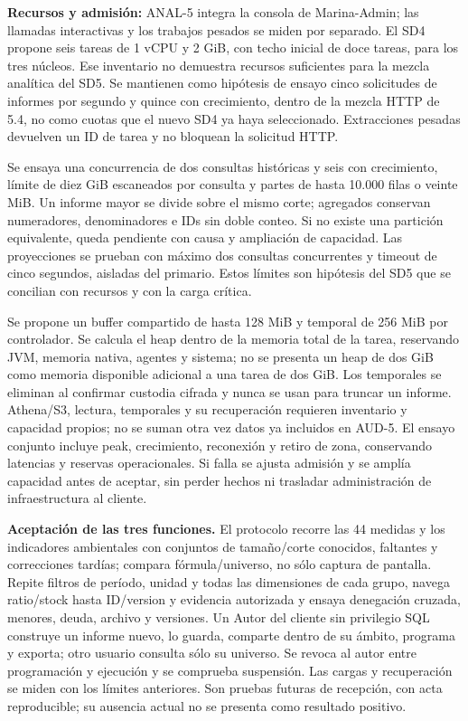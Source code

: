 \textbf{Recursos y admisión:} 
ANAL-5 integra la consola de Marina-Admin; las llamadas interactivas y los trabajos pesados se miden por separado. El SD4 propone seis tareas de 1 vCPU y 2 GiB, con techo inicial de doce tareas, para los tres núcleos. Ese inventario no demuestra recursos suficientes para la mezcla analítica del SD5. Se mantienen como hipótesis de ensayo cinco solicitudes de informes por segundo y quince con crecimiento, dentro de la mezcla HTTP de 5.4, no como cuotas que el nuevo SD4 ya haya seleccionado. Extracciones pesadas devuelven un ID de tarea y no bloquean la solicitud HTTP.

Se ensaya una concurrencia de dos consultas históricas y seis con crecimiento, límite de diez GiB escaneados por consulta y partes de hasta 10.000 filas o veinte MiB. Un informe mayor se divide sobre el mismo corte; agregados conservan numeradores, denominadores e IDs sin doble conteo. Si no existe una partición equivalente, queda pendiente con causa y ampliación de capacidad. Las proyecciones se prueban con máximo dos consultas concurrentes y timeout de cinco segundos, aisladas del primario. Estos límites son hipótesis del SD5 que se concilian con recursos y con la carga crítica.

Se propone un buffer compartido de hasta 128 MiB y temporal de 256 MiB por controlador. Se calcula el heap dentro de la memoria total de la tarea, reservando JVM, memoria nativa, agentes y sistema; no se presenta un heap de dos GiB como memoria disponible adicional a una tarea de dos GiB. Los temporales se eliminan al confirmar custodia cifrada y nunca se usan para truncar un informe. Athena/S3, lectura, temporales y su recuperación requieren inventario y capacidad propios; no se suman otra vez datos ya incluidos en AUD-5. El ensayo conjunto incluye peak, crecimiento, reconexión y retiro de zona, conservando latencias y reservas operacionales. Si falla se ajusta admisión y se amplía capacidad antes de aceptar, sin perder hechos ni trasladar administración de infraestructura al cliente.

\textbf{Aceptación de las tres funciones.} El protocolo recorre las 44 medidas y los indicadores ambientales con conjuntos de tamaño/corte conocidos, faltantes y correcciones tardías; compara fórmula/universo, no sólo captura de pantalla. Repite filtros de período, unidad y todas las dimensiones de cada grupo, navega ratio/stock hasta ID/version y evidencia autorizada y ensaya denegación cruzada, menores, deuda, archivo y versiones. Un Autor del cliente sin privilegio SQL construye un informe nuevo, lo guarda, comparte dentro de su ámbito, programa y exporta; otro usuario consulta sólo su universo. Se revoca al autor entre programación y ejecución y se comprueba suspensión. Las cargas y recuperación se miden con los límites anteriores. Son pruebas futuras de recepción, con acta reproducible; su ausencia actual no se presenta como resultado positivo.
